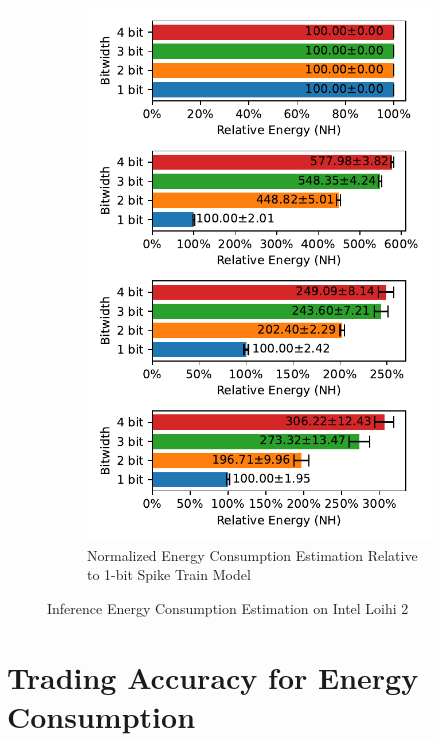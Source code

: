 \begin{figure}[H]
            \hfill
            \begin{subfigure}[H]{0.495\textwidth}
                \includegraphics[width=\textwidth]{../standard/CIFAR10/plots/cifar10_test_relative_energy_nh.pdf}
                \caption{Normalized Energy Consumption Estimation Relative to 1-bit Spike Train Model}
            \end{subfigure}
            \caption{Inference Energy Consumption Estimation on Intel Loihi 2}
        \end{figure}

\section{Trading Accuracy for Energy Consumption}
\label{appendix:energy_tradeoff}

